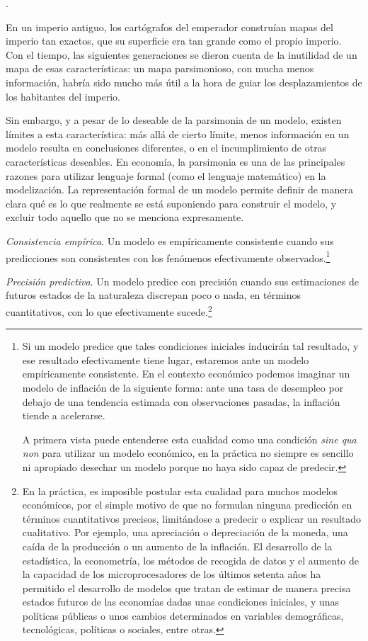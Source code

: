 \documentclass[10pt,a4paper]{article}
\newcounter{numitem}
\newenvironment{lnum}
      {\begin{list}{\arabic{numitem}.}{%
          \usecounter{numitem}%
          \setlength{\leftmargin}{1cm}%
          \setlength{\parskip}{3pt}%
          \setlength{\itemsep}{0pt}%
          \setlength{\parsep}{0pt}%
      }}
      {\end{list}}
\begin{document}
\begin{lnum}
{    En un imperio antiguo, los cartógrafos del emperador construían mapas del imperio tan exactos, que su superficie era tan grande como el propio imperio. Con el tiempo, las siguientes generaciones se dieron cuenta de la inutilidad de un mapa de esas características: un mapa parsimonioso, con mucha menos información, habría sido mucho más útil a la hora de guiar los desplazamientos de los habitantes del imperio. 
    
    Sin embargo, y a pesar de lo deseable de la parsimonia de un modelo, existen límites a esta característica: más allá de cierto límite, menos información en un modelo resulta en conclusiones diferentes, o en el incumplimiento de otras características deseables. En economía, la parsimonia es una de las principales razones para utilizar lenguaje formal (como el lenguaje matemático) en la modelización. La representación formal de un modelo permite definir de manera clara qué es lo que realmente se está suponiendo para construir el modelo, y excluir todo aquello que no se menciona expresamente.
    }
    \item \textit{Consistencia empírica}. Un modelo es empíricamente consistente cuando sus predicciones son consistentes con los fenómenos efectivamente observados.\footnote{%
        Si un modelo predice que tales condiciones iniciales inducirán tal resultado, y ese resultado efectivamente tiene lugar, estaremos ante un modelo empíricamente consistente. En el contexto económico podemos imaginar un modelo de inflación de la siguiente forma: ante una tasa de desempleo por debajo de una tendencia estimada con observaciones pasadas, la inflación tiende a acelerarse.
    
    A primera vista puede entenderse esta cualidad como una condición \textit{sine qua non} para utilizar un modelo económico, en la práctica no siempre es sencillo ni apropiado desechar un modelo porque no haya sido capaz de predecir.
    }
    \item \textit{Precisión predictiva}. Un modelo predice con precisión cuando sus estimaciones de futuros estados de la naturaleza discrepan poco o nada, en términos cuantitativos, con lo que efectivamente sucede.\footnote{%
        En la práctica, es imposible postular esta cualidad para muchos modelos económicos, por el simple motivo de que no formulan ninguna predicción en términos cuantitativos precisos, limitándose a predecir o explicar un resultado cualitativo. Por ejemplo, una apreciación o depreciación de la moneda, una caída de la producción o un aumento de la inflación. El desarrollo de la estadística, la econometría, los métodos de recogida de datos y el aumento de la capacidad de los microprocesadores de los últimos setenta años ha permitido el desarrollo de modelos que tratan de estimar de manera precisa estados futuros de las economías dadas unas condiciones iniciales, y unas políticas públicas o unos cambios determinados en variables demográficas, tecnológicas, políticas o sociales, entre otras.
    }
\end{lnum}
\end{document}
